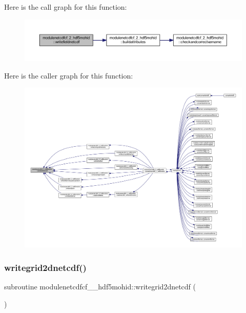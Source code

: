 Here is the call graph for this function\+:\nopagebreak
\begin{figure}[H]
\begin{center}
\leavevmode
\includegraphics[width=350pt]{namespacemodulenetcdfcf__2__hdf5mohid_ab5904631b48441b51fae172f8cfe49f4_cgraph}
\end{center}
\end{figure}
Here is the caller graph for this function\+:\nopagebreak
\begin{figure}[H]
\begin{center}
\leavevmode
\includegraphics[width=350pt]{namespacemodulenetcdfcf__2__hdf5mohid_ab5904631b48441b51fae172f8cfe49f4_icgraph}
\end{center}
\end{figure}
\mbox{\label{namespacemodulenetcdfcf__2__hdf5mohid_ae7c9e3dcc5e862ce4bcb8836b9f03f77}} 
\subsubsection{\texorpdfstring{writegrid2dnetcdf()}{writegrid2dnetcdf()}}
{\footnotesize\ttfamily subroutine modulenetcdfcf\+\_\+\_\+hdf5mohid\+::writegrid2dnetcdf (\begin{DoxyParamCaption}{ }\end{DoxyParamCaption})\hspace{0.3cm}{\ttfamily [private]}}

